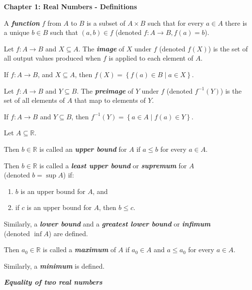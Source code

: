 \documentclass[12pt]{article}
\newcommand{\RR}{\mathbb{R}} %
\newcommand\set[1]{\left\lbrace #1 \right\rbrace} %
\newcommand\defword[1]{\textit{\textbf{#1}}}
\begin{document}
\setlength{\parindent}{0pt}
\large
\textbf{Chapter 1: Real Numbers - Definitions}

\hrulefill

A \defword{function} $f$ from $A$ to $B$ is a subset of $A \times B$ such that for every $a \in A$ there is a unique $b \in B$ such that $(a, b) \in f$ (denoted $f : A \rightarrow B, f(a) = b$).

\hrulefill

Let $f : A \rightarrow B$ and $X \subseteq A$. The \defword{image} of $X$ under $f$ (denoted $f(X)$) is the set of all output values produced when $f$ is applied to each element of $A$.

If $f: A \rightarrow B$, and $X \subseteq A$, then $f(X) = \set{f(a) \in B \mid a \in X}$.

\hrulefill

Let $f : A \rightarrow B$ and $Y \subseteq B$. The \defword{preimage} of $Y$ under $f$ (denoted $f^{-1}(Y)$) is the set of all elements of $A$ that map to elements of $Y$.

If $f : A \rightarrow B$ and $Y \subseteq B$, then $f^{-1}(Y) = \set{a \in A \mid f(a) \in Y}$.

\hrulefill

Let $A \subseteq \RR$.

Then $b \in \RR$ is called an \defword{upper bound} for $A$ if $a \le b$ for every $a \in A$.

Then $b \in \RR$ is called a \defword{least upper bound} or \defword{supremum} for $A$
\\
(denoted $b = \sup A$) if:

\begin{enumerate}
\item $b$ is an upper bound for $A$, and
\item if $c$ is an upper bound for $A$, then $b \le c$.
\end{enumerate}

Similarly, a \defword{lower bound} and a \defword{greatest lower bound} or \defword{infimum}
\\
(denoted $\inf A$) are defined.

\hrulefill

Then $a_0 \in \RR$ is called a \defword{maximum} of $A$ if $a_0 \in A$ and $a \le a_0$ for every $a \in A$.

Similarly, a \defword{minimum} is defined.

\hrulefill

\defword{Equality of two real numbers}
\end{document}
